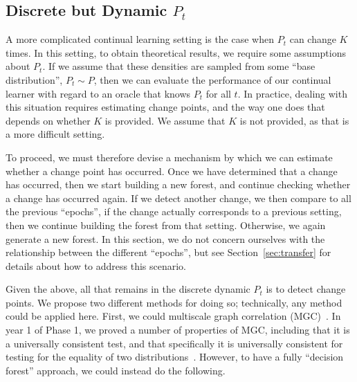 \documentclass{article}
\begin{document}
\subsection{Discrete but Dynamic $P_t$}
\label{sec:jumps}

A more complicated continual learning setting is the case when $P_t$ can change $K$ times.  In this setting, to obtain theoretical results, we require some assumptions about $P_t$.  If we assume that these densities are sampled from some ``base distribution'', $P_t \sim P$, then we can evaluate the performance of our continual learner with regard to an oracle that knows $P_t$ for all $t$. In practice, dealing with this situation requires estimating change points, and the way one does that depends on whether $K$ is provided.  We assume that $K$ is not provided, as that is a more difficult setting.  

To proceed, we must therefore devise a mechanism by which we can estimate whether a change point has occurred. Once we have determined that a change has occurred, then we start building a new forest, and continue checking whether a change has occurred again.  If we detect another change, we then compare to all the previous ``epochs'', if the change actually corresponds to a previous setting, then we continue building the forest from that setting.  Otherwise, we again generate a new forest. In this section, we do not concern ourselves with the relationship between the different ``epochs'', but see Section~\ref{sec:transfer} for details about how to address this scenario.   

Given the above, all that remains in the discrete dynamic $P_t$ is to detect change points. We propose two different methods for doing so; technically, any method could be applied here. First, we could multiscale graph correlation (MGC)~\cite{mgc1, mgc2}.  In year 1 of Phase 1, we proved a number of properties of MGC, including that it is a universally consistent test, and that specifically it is universally consistent for testing for the equality of two distributions~\cite{exact}.  However, to have a fully ``decision forest'' approach, we could instead do the following. 
\end{document}
